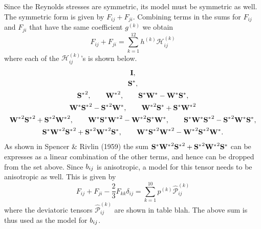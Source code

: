 \documentclass[oneside,a4paper,11pt]{report}
\begin{document}
Since the Reynolds stresses are symmetric, its model must be symmetric as well. The symmetric form is given by $F_{ij} + F_{ji}$. Combining terms in the sums for $F_{ij}$ and $F_{ji}$ that have the same coefficient $g^{(k)}$ we obtain
\begin{equation}
F_{ij} + F_{ji} = \sum_{k=1}^{12} h^{(k)} \mathcal{H}_{ij}^{(k)}
\end{equation}
where each of the $\mathcal{H}_{ij}^{(k)}$'s is shown below.
\begin{gather}
\mathbf{I}, \nonumber \\
\mathbf{S^*}, \nonumber \\
\mathbf{S^*}^2, \qquad \mathbf{W^*}^2, \qquad \mathbf{S^*} \mathbf{W^*} - \mathbf{W^*} \mathbf{S^*}, \nonumber \\
\mathbf{W^*} \mathbf{S^*}^2 - \mathbf{S^*}^2 \mathbf{W^*}, \qquad \mathbf{W^*}^2 \mathbf{S^*} + \mathbf{S^*} \mathbf{W^*}^2 \nonumber \\
\mathbf{W^*}^2 \mathbf{S^*}^2 + \mathbf{S^*}^2 \mathbf{W^*}^2, \qquad \mathbf{W^*} \mathbf{S^*} \mathbf{W^*}^2 - \mathbf{W^*}^2 \mathbf{S^*} \mathbf{W^*}, \qquad \mathbf{S^*} \mathbf{W^*} \mathbf{S^*}^2 - \mathbf{S^*}^2 \mathbf{W^*} \mathbf{S^*} ,\nonumber \\
\mathbf{S^*} \mathbf{W^*}^2 \mathbf{S^*}^2 + \mathbf{S^*}^2 \mathbf{W^*}^2 \mathbf{S^*}, \qquad \mathbf{W^*} \mathbf{S^*}^2 \mathbf{W^*}^2 - \mathbf{W^*}^2 \mathbf{S^*}^2 \mathbf{W^*}.
\end{gather}
As shown in Spencer \& Rivlin (1959) the sum $\mathbf{S^*} \mathbf{W^*}^2 \mathbf{S^*}^2 + \mathbf{S^*}^2 \mathbf{W^*}^2 \mathbf{S^*}$ can be expresses as a linear combination of the other terms, and hence can be dropped from the set above. Since $b_{ij}$ is anisotropic, a model for this tensor needs to be anisotropic as well. This is given by 
\begin{equation}
F_{ij} + F_{ji} - \frac{2}{3} F_{kk} \delta_{ij} = \sum_{k=1}^{10} p^{(k)} \hat{\mathcal{P}}_{ij}^{(k)}
\end{equation}
where the deviatoric tensors $\hat{\mathcal{P}}_{ij}^{(k)}$ are shown in table blah. The above sum is thus used as the model for $b_{ij}$.
\end{document}
